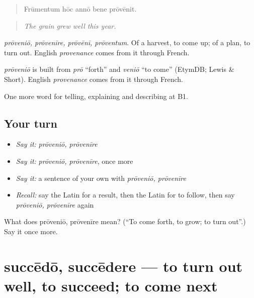 \begin{quote}
Frūmentum hōc annō bene prōvēnit.
\end{quote}

\begin{quote}
\emph{The grain grew well this year.}
\end{quote}

\emph{prōveniō, prōvenīre, prōvēnī, prōventum}. Of a harvest, to come up; of a plan, to turn out. English \emph{provenance} comes from it through French.

\begin{cousinweb}
\emph{prōveniō} is built from \emph{prō} \textquotedblleft{}forth\textquotedblright{} and \emph{veniō} \textquotedblleft{}to come\textquotedblright{} (EtymDB; Lewis \& Short). English \emph{provenance} comes from it through French.
\end{cousinweb}

\begin{grammarlens}[title={What you've built}]
One more word for telling, explaining and describing at B1.
\end{grammarlens}

\subsection*{Your turn}
\begin{itemize}
\raggedright
  \item \emph{Say it:} \emph{prōveniō, prōvenīre}
  \item \emph{Say it:} \emph{prōveniō, prōvenīre}, once more
  \item \emph{Say it:} a sentence of your own with \emph{prōveniō, prōvenīre}
  \item \emph{Recall:} say the Latin for a result, then the Latin for to follow, then say \emph{prōveniō, prōvenīre} again
\end{itemize}

\begin{tcolorbox}[breakable,colback=teal!4,colframe=teal!35!black,title={Before you move on}]
What does prōveniō, prōvenīre mean? (\textquotedblleft{}To come forth, to grow; to turn out\textquotedblright{}.) Say it once more.
\end{tcolorbox}
\section[succēdō, succēdere]{succēdō, succēdere — to turn out well, to succeed; to come next}

